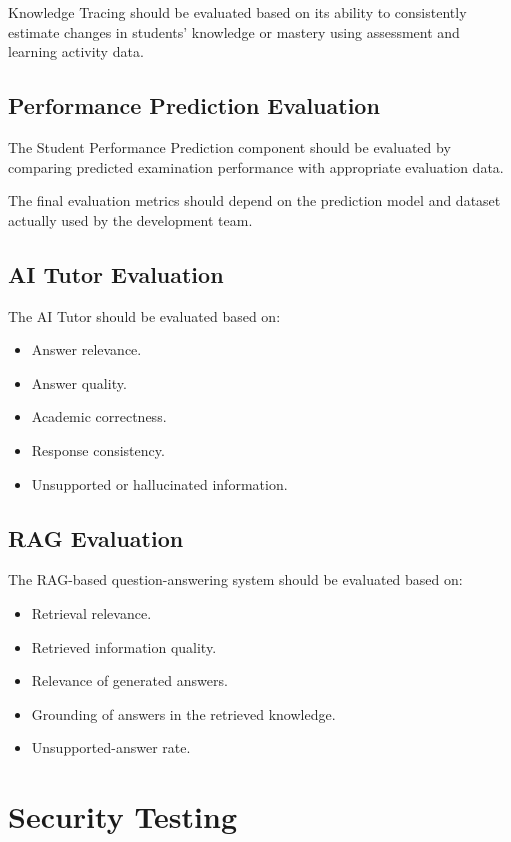 Knowledge Tracing should be evaluated based on its ability to consistently estimate changes in students' knowledge or mastery using assessment and learning activity data.

\subsection{Performance Prediction Evaluation}

The Student Performance Prediction component should be evaluated by comparing predicted examination performance with appropriate evaluation data.

The final evaluation metrics should depend on the prediction model and dataset actually used by the development team.

\subsection{AI Tutor Evaluation}

The AI Tutor should be evaluated based on:

\begin{itemize}
	\item Answer relevance.
	\item Answer quality.
	\item Academic correctness.
	\item Response consistency.
	\item Unsupported or hallucinated information.
\end{itemize}

\subsection{RAG Evaluation}

The RAG-based question-answering system should be evaluated based on:

\begin{itemize}
	\item Retrieval relevance.
	\item Retrieved information quality.
	\item Relevance of generated answers.
	\item Grounding of answers in the retrieved knowledge.
	\item Unsupported-answer rate.
\end{itemize}

\section{Security Testing}

